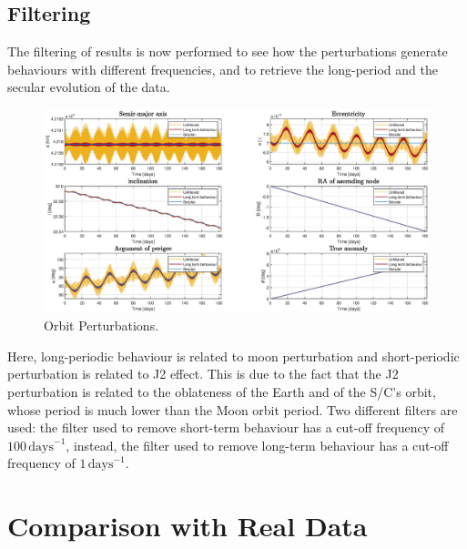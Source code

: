 \documentclass{article}
\begin{document}
\subsection{Filtering} 

The filtering of results is now performed to see how the perturbations generate behaviours with different frequencies, and to retrieve the long-period and the secular evolution of the data.

\begin{figure}[H]
	\centering
	\includegraphics[width=1\textwidth]{filter0.5year.eps}
	\caption{Orbit Perturbations.}
	\label{fig:filtering}
\end{figure}

Here, long-periodic behaviour is related to moon perturbation and short-periodic perturbation is related to J2 effect. This is due to the fact that the J2 perturbation is related to the oblateness of the Earth and of the S/C’s orbit, whose period is much lower than the Moon orbit period. Two different filters are used: the filter used to remove short-term behaviour has a cut-off frequency of \(100 \, \text{days}^{-1}\), instead, the filter used to remove long-term behaviour has a cut-off frequency of \(1 \, \text{days}^{-1}\).


\section{Comparison with Real Data}
\end{document}
